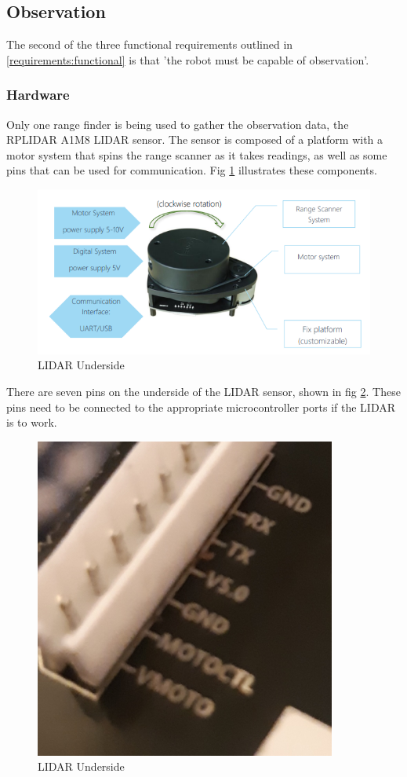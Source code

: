 			\subsection{Observation}
			The second of the three functional requirements outlined in \ref{requirements:functional} is that 'the robot must be capable of observation'.
				\subsubsection{Hardware}
				Only one range finder is being used to gather the observation data, the RPLIDAR A1M8 LIDAR sensor. The sensor is composed of a platform with a motor system that spins the range scanner as it takes readings, as well as some pins that can be used for communication. Fig \ref{fig:rplidarconfig} illustrates these components.
				
				\begin{figure}[h]
					\centering
					\includegraphics[width=.9\linewidth]{SYNTHESIS/rplidar_configuration.png}
					\caption{LIDAR Underside}
					\label{fig:rplidarconfig}
				\end{figure}
			
				There are seven pins on the underside of the LIDAR sensor, shown in fig \ref{fig:lidarunderside}. These pins need to be connected to the appropriate microcontroller ports if the LIDAR is to work. 
				\begin{figure}[h]
					\centering
					\includegraphics[width=.4\linewidth]{SYNTHESIS/lidarunderside.png}
					\caption{LIDAR Underside}
					\label{fig:lidarunderside}
				\end{figure}
				
